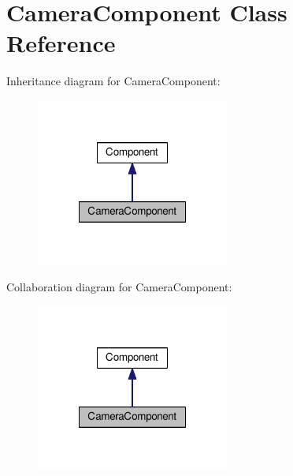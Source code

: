 \hypertarget{classCameraComponent}{\section{Camera\-Component Class Reference}
\label{classCameraComponent}
}


Inheritance diagram for Camera\-Component\-:
\nopagebreak
\begin{figure}[H]
\begin{center}
\leavevmode
\includegraphics[width=180pt]{classCameraComponent__inherit__graph}
\end{center}
\end{figure}


Collaboration diagram for Camera\-Component\-:
\nopagebreak
\begin{figure}[H]
\begin{center}
\leavevmode
\includegraphics[width=180pt]{classCameraComponent__coll__graph}
\end{center}
\end{figure}
